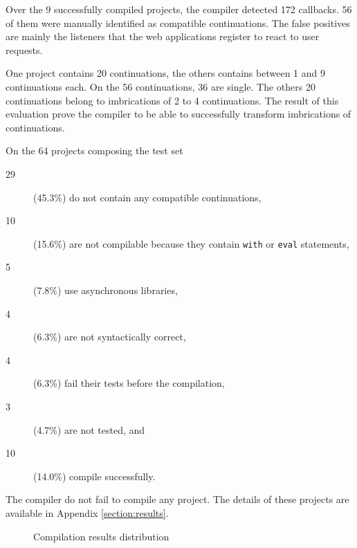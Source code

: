 Over the 9 successfully compiled projects, the compiler detected 172 callbacks.
56 of them were manually identified as compatible continuations.
The false positives are mainly the listeners that the web applications register to react to user requests.

One project contains 20 continuations, the others contains between 1 and 9 continuations each.
On the 56 continuations, 36 are single. %
The others 20 continuations belong to imbrications of 2 to 4 continuations.
The result of this evaluation prove the compiler to be able to successfully transform imbrications of continuations.

On the 64 projects composing the test set
\begin{description}
\item[29] (45.3\%) do not contain any compatible continuations,
\item[10] (15.6\%) are not compilable because they contain \texttt{with} or \texttt{eval} statements,
\item[5] (7.8\%) use asynchronous libraries,
\item[4] (6.3\%) are not syntactically correct,
\item[4] (6.3\%) fail their tests before the compilation,
\item[3] (4.7\%) are not tested, and
\item[10] (14.0\%) compile successfully.
\end{description}
The compiler do not fail to compile any project.
The details of these projects are available in Appendix \ref{section:results}.

\begin{figure}[h!]
\caption{Compilation results distribution}
\end{figure}























